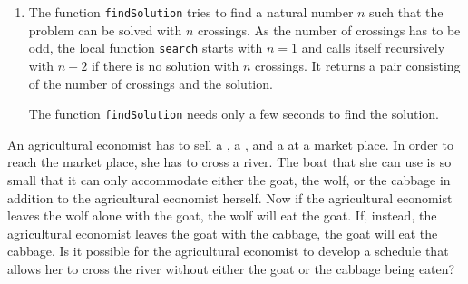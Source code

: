 \begin{enumerate}
\begin{enumerate}
       \item The local function \texttt{text} is only used to create a readable description of a constraint.
       \end{enumerate}
       Line 9 ensures that the invariant of the transition system is valid after every crossing of the boat.
       Lines 10 and 11 describe the mechanics of the crossing.
\item The function \texttt{findSolution} tries to find a natural number $n$ such that the problem can be solved
       with $n$ crossings. As the number of crossings has to be odd, the local function \texttt{search} starts
       with $n = 1$ and calls itself recursively with $n + 2$ if there is no solution with $n$ crossings.
       It returns a pair consisting of the number of crossings and the solution.

       The function \texttt{findSolution} needs only a few seconds to find the solution.
\end{enumerate}

\exerciseEng
An agricultural economist has to sell a , a , and a 
at a market place.  In order to reach the market place, she has to cross a river.  The
boat that she can use is so small that it can only accommodate either the goat, the wolf,
or the cabbage in addition to the agricultural economist herself.  Now if the agricultural
economist leaves the wolf alone with the goat, the wolf will eat the goat.  If, instead,
the agricultural economist leaves the goat with the cabbage, the goat will eat the
cabbage.  Is it possible for the agricultural economist to develop a schedule that allows
her to cross the river without either the goat or the cabbage being eaten?

